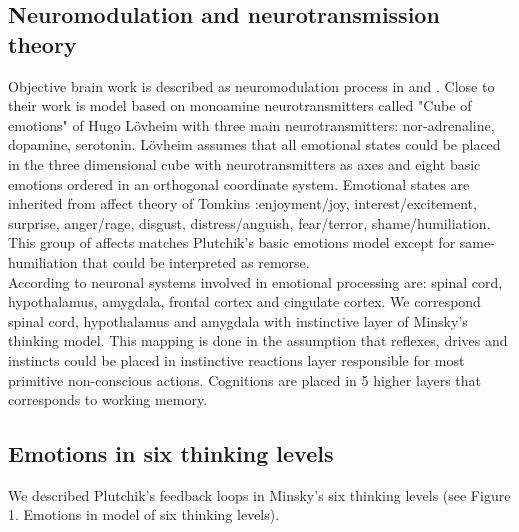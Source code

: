 \subsection{Neuromodulation and neurotransmission theory}

Objective brain work is described as neuromodulation process in \cite{neuromodulatory} and \cite{emotionsbraintorobot}.
Close to their work is model based on monoamine neurotransmitters called "Cube of emotions" of Hugo L\"{o}vheim \cite{cubeofemotions} with three main neurotransmitters: nor-adrenaline, dopamine, serotonin. L\"{o}vheim assumes that all emotional states could be placed in the three dimensional cube with neurotransmitters as axes and eight basic emotions ordered in an orthogonal coordinate system. Emotional states are inherited from affect theory of Tomkins \cite{tomkins1, tomkins2, tomkins3}:enjoyment/joy, interest/excitement, surprise, anger/rage, disgust, distress/anguish, fear/terror, shame/humiliation. This group of affects matches  Plutchik's basic emotions model except for same-humiliation that could be interpreted as remorse.\\
According to \cite{emotionsbraintorobot} neuronal systems involved in emotional processing are: spinal cord, hypothalamus, amygdala, frontal cortex and cingulate cortex. We correspond spinal cord, hypothalamus and amygdala with instinctive layer of Minsky's thinking model. This mapping is done in the assumption that reflexes, drives and instincts could be placed in instinctive reactions layer responsible for most primitive non-conscious actions. Cognitions are placed in 5 higher layers that corresponds to working memory.

\subsection{Emotions in six thinking levels}

We described Plutchik's feedback loops \cite{natureofemotions} in Minsky's six thinking levels (see Figure 1. Emotions in model of six thinking levels).

